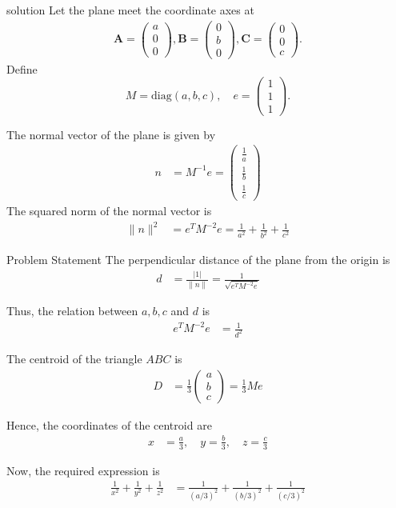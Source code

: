 \documentclass{beamer}
\numberwithin{equation}{section}
\theoremstyle{remark}
\newcommand{\myvec}[1]{\ensuremath{\begin{pmatrix}#1\end{pmatrix}}}
\let\vec\mathbf
\begin{document}
\begin{frame}{solution}
Let the plane meet the coordinate axes at 
\begin{align*}
\vec{A} = \myvec{a\\0\\0}, 
\vec{B} = \myvec{0\\b\\0}, 
\vec{C} = \myvec{0\\0\\c}.
\end{align*}
Define
\[
M = \mathrm{diag}(a,b,c), 
\quad 
e = \myvec{1 \\ 1 \\ 1}.
\]

The normal vector of the plane is given by
\begin{align}
n &= M^{-1} e 
= \myvec{ \tfrac{1}{a} \\[6pt] \tfrac{1}{b} \\[6pt] \tfrac{1}{c} }
\end{align}
The squared norm of the normal vector is
\begin{align}
\|n\|^2 &= e^T M^{-2} e 
= \frac{1}{a^2} + \frac{1}{b^2} + \frac{1}{c^2}
\end{align}
\end{frame}
\begin{frame}{Problem Statement}
The perpendicular distance of the plane from the origin is
\begin{align}
d &= \frac{|1|}{\|n\|} 
= \frac{1}{\sqrt{e^T M^{-2} e}}
\end{align}

Thus, the relation between $a,b,c$ and $d$ is
\begin{align}
e^T M^{-2} e &= \frac{1}{d^2}
\end{align}

The centroid of the triangle $ABC$ is
\begin{align}
D &= \frac{1}{3} \myvec{ a \\ b \\ c } 
= \frac{1}{3} M e
\end{align}

Hence, the coordinates of the centroid are
\begin{align}
x &= \tfrac{a}{3}, \quad y = \tfrac{b}{3}, \quad z = \tfrac{c}{3}
\end{align}

Now, the required expression is
\begin{align}
\frac{1}{x^2} + \frac{1}{y^2} + \frac{1}{z^2} 
&= \frac{1}{(a/3)^2} + \frac{1}{(b/3)^2} + \frac{1}{(c/3)^2}
\end{align}
\end{frame}
\end{document}
